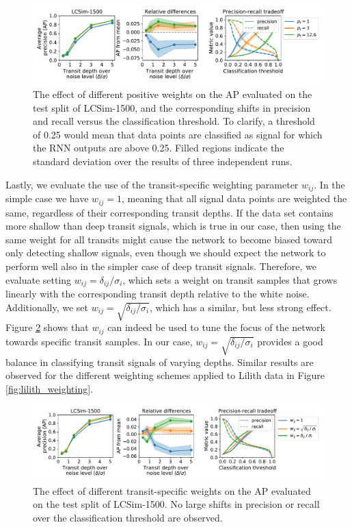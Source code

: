\begin{figure}
    \centering
    \includegraphics[width=0.9\linewidth]{Experiments/Figures/Models/lcsim1500_AP_weighting-p.pdf}
    \caption{The effect of different positive weights on the AP evaluated on the test split of LCSim-1500, and the corresponding shifts in precision and recall versus the classification threshold. To clarify, a threshold of 0.25 would mean that data points are classified as signal for which the RNN outputs are above 0.25. Filled regions indicate the standard deviation over the results of three independent runs.}
    \label{fig:lcsim_weight_p}
\end{figure}

Lastly, we evaluate the use of the transit-specific weighting parameter $w_{ij}$. In the simple case we have $w_{ij} = 1$, meaning that all signal data points are weighted the same, regardless of their corresponding transit depths. If the data set contains more shallow than deep transit signals, which is true in our case, then using the same weight for all transits might cause the network to become biased toward only detecting shallow signals, even though we should expect the network to perform well also in the simpler case of deep transit signals. Therefore, we evaluate setting $w_{ij} = \delta_{ij}/\sigma_i$, which sets a weight on transit samples that grows linearly with the corresponding transit depth relative to the white noise. Additionally, we set $w_{ij} = \sqrt{\delta_{ij}/\sigma_i}$, which has a similar, but less strong effect. Figure \ref{fig:lcsim_weight_w} shows that $w_{ij}$ can indeed be used to tune the focus of the network towards specific transit samples. In our case, $w_{ij} = \sqrt{\delta_{ij}/\sigma_i}$ provides a good balance in classifying transit signals of varying depths. Similar results are observed for the different weighting schemes applied to Lilith data in Figure \ref{fig:lilith_weighting}.

\begin{figure}
    \centering
    \includegraphics[width=0.9\linewidth]{Experiments/Figures/Models/lcsim1500_AP_weighting-w.pdf}
    \caption{The effect of different transit-specific weights on the AP evaluated on the test split of LCSim-1500. No large shifts in precision or recall over the classification threshold are observed. }
    \label{fig:lcsim_weight_w}
\end{figure}

